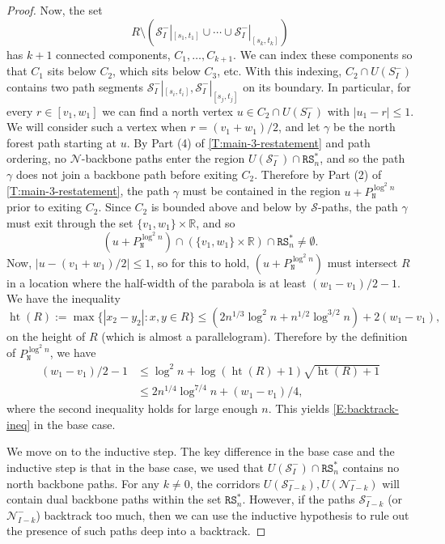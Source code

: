 \documentclass[11pt,twoside]{amsart}
\theoremstyle{plain}
\numberwithin{quest}{section}
\theoremstyle{remark}
\numberwithin{rem}{section}
\theoremstyle{definition}
\newcommand{\R}{\mathbb{R}}
\newcommand{\cS}{\mathcal{S}}
\newcommand{\cN}{\mathcal{N}}
\renewcommand{\tt}[1]{{\mathtt{#1}}}
\begin{document}
\begin{proof}
    Now, the set
	$$
	R \setminus (\cS_I^-|_{[s_1, t_1]} \cup \cdots  \cup \cS_I^-|_{[s_k, t_k]})
	$$
	has $k+1$ connected components, $C_1, \dots, C_{k+1}$. We can index these components so that $C_1$ sits below $C_2$, which sits below $C_3$, etc. With this indexing, $C_2 \cap U(S_I^-)$ contains two path segments $\cS_I^-|_{[s_i, t_i]}, \cS_I^-|_{[s_{j}, t_{j}]}$ on its boundary.
In particular, for every $r \in [v_1, w_1]$ we can find a north vertex $u \in C_2 \cap U(S_I^-)$ with $|u_1 - r| \le 1$. We will consider such a vertex when $r = (v_1 + w_1)/2$, and let $\gamma$ be the north forest path starting at $u$. By Part (4) of \cref{T:main-3-restatement} and path ordering, no $\cN$-backbone paths enter the region $U(\cS_I^-) \cap \tt{RS}_n^*$, and so the path $\gamma$ does not join a backbone path before exiting $C_2$. Therefore by Part (2) of  \cref{T:main-3-restatement}, the path $\gamma$ must be contained in the region $u + P^{\log^2 n}_\tt{N}$ prior to exiting $C_2$. Since $C_2$ is bounded above and below by $\cS$-paths, the path $\gamma$ must exit through the set $\{v_1, w_1\} \times \R$, and so
	\begin{equation}
		\label{E:important-disjoint}
(u + P^{\log^2 n}_\tt{N}) \cap (\{v_1, w_1\} \times \R) \cap \tt{RS}_n^* \ne \emptyset.
	\end{equation}
Now, $|u - (v_1 + w_1)/2| \le 1$, so for this to hold, $(u + P^{\log^2 n}_\tt{N})$ must intersect $R$ in a location where the half-width of the parabola is at least $(w_1 -v_1)/2 - 1$. We have the inequality
$$
\operatorname{ht}(R) := \max \{|x_2 - y_2| : x, y \in R\} \le (2n^{1/3} \log^2 n + n^{1/2} \log^{3/2} n) + 2 (w_1 - v_1),
$$
on the height of $R$ (which is almost a parallelogram). Therefore by the definition of $P^{\log^2 n}_\tt{N}$, we have
\begin{align}
	\nonumber
(w_1 -v_1)/2 - 1 &\le \log^2 n + \log(\operatorname{ht}(R) + 1)\sqrt{\operatorname{ht}(R) + 1} \\
\label{E:paraben}
&\le 2n^{1/4} \log^{7/4} n + (w_1 -v_1)/4,
\end{align}
where the second inequality holds for large enough $n$. This yields \eqref{E:backtrack-ineq} in the base case.

We move on to the inductive step. The key difference in the base case and the inductive step is that in the base case, we used that $U(\cS_I^-) \cap\tt{RS}_n^*$ contains no north backbone paths. For any $k \ne 0$, the corridors $U(\cS_{I-k}^-), U(\cN_{I-k}^-)$ will contain dual backbone paths within the set $\tt{RS}_n^*$. However, if the paths $\cS_{I-k}^-$ (or $\cN_{I-k}^-$) backtrack too much, then we can use the inductive hypothesis to rule out the presence of such paths deep into a backtrack. 


\end{proof}
\end{document}
